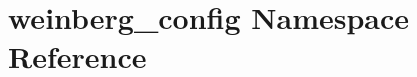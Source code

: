 \hypertarget{namespaceweinberg__config}{}\section{weinberg\+\_\+config Namespace Reference}
\label{namespaceweinberg__config}
